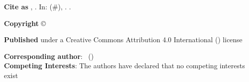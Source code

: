 \begin{minipage}{\headwidth}
\vfill
\begin{framed}
  \footnotesize \sf

  \ifdefempty{\articleDOI}{
    \textcolor{darkred}{\large \bfseries Non peer-reviewed author version}
  }
  {\textbf{Cite as} \articleTITLE, \authorsABBRV.
                     In: {\em \journalNAME}
                     \journalVOLUME(\#\articleNUMBER), \articleYEAR.
                     .\par}

%

\textbf{Copyright} ©~\articleYEAR~\authorsABBRV\par
\textbf{Published} under a Creative Commons Attribution 4.0 International
(\href{https://creativecommons.org/licenses/by/4.0/}{\ccLogo\ccAttribution}) license\par
%
\textbf{Corresponding author}:
\contactNAME~(\href{mailto:\contactEMAIL}{\contactEMAIL})\\
\textbf{Competing Interests}:
The authors have declared that no competing interests exist\par
\end{framed}

  
%
\end{minipage}


\clearpage

